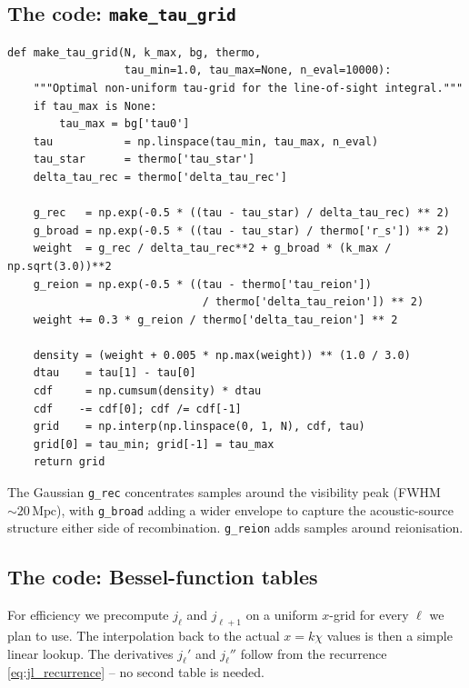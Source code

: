 \subsection{The code: \texttt{make\_tau\_grid}}

\begin{codebox}
\begin{lstlisting}[style=python]
def make_tau_grid(N, k_max, bg, thermo,
                  tau_min=1.0, tau_max=None, n_eval=10000):
    """Optimal non-uniform tau-grid for the line-of-sight integral."""
    if tau_max is None:
        tau_max = bg['tau0']
    tau           = np.linspace(tau_min, tau_max, n_eval)
    tau_star      = thermo['tau_star']
    delta_tau_rec = thermo['delta_tau_rec']

    g_rec   = np.exp(-0.5 * ((tau - tau_star) / delta_tau_rec) ** 2)
    g_broad = np.exp(-0.5 * ((tau - tau_star) / thermo['r_s']) ** 2)
    weight  = g_rec / delta_tau_rec**2 + g_broad * (k_max / np.sqrt(3.0))**2
    g_reion = np.exp(-0.5 * ((tau - thermo['tau_reion'])
                              / thermo['delta_tau_reion']) ** 2)
    weight += 0.3 * g_reion / thermo['delta_tau_reion'] ** 2

    density = (weight + 0.005 * np.max(weight)) ** (1.0 / 3.0)
    dtau    = tau[1] - tau[0]
    cdf     = np.cumsum(density) * dtau
    cdf    -= cdf[0]; cdf /= cdf[-1]
    grid    = np.interp(np.linspace(0, 1, N), cdf, tau)
    grid[0] = tau_min; grid[-1] = tau_max
    return grid
\end{lstlisting}
\end{codebox}

\noindent The Gaussian \texttt{g\_rec} concentrates samples around the visibility peak (FWHM $\sim 20\,\mathrm{Mpc}$), with \texttt{g\_broad} adding a wider envelope to capture the acoustic-source structure either side of recombination. \texttt{g\_reion} adds samples around reionisation.

\subsection{The code: Bessel-function tables}

For efficiency we precompute $j_\ell$ and $j_{\ell+1}$ on a uniform $x$-grid for every $\ell$ we plan to use. The interpolation back to the actual $x = k\chi$ values is then a simple linear lookup. The derivatives $j_\ell'$ and $j_\ell''$ follow from the recurrence \cref{eq:jl_recurrence} -- no second table is needed.

